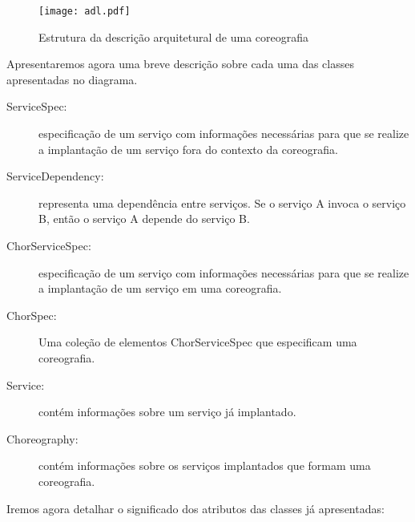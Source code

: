 \begin{figure}[!h]
  \centering
  \texttt{[image: adl.pdf]} 
  \caption{Estrutura da descrição arquitetural de uma coreografia}
  \label{fig:ee_adl} 
\end{figure}

Apresentaremos agora uma breve descrição sobre cada uma das classes apresentadas no diagrama.

\begin{description}

\item [ServiceSpec:] especificação de um serviço com informações necessárias para que se realize a implantação de um serviço fora do contexto da coreografia.

\item [ServiceDependency:] representa uma dependência entre serviços. Se o serviço A invoca o serviço B, então o serviço A depende do serviço B.

\item [ChorServiceSpec:] especificação de um serviço com informações necessárias para que se realize a implantação de um serviço em uma coreografia.

\item [ChorSpec:] Uma coleção de elementos ChorServiceSpec que especificam uma coreografia.

\item [Service:] contém informações sobre um serviço já implantado.

\item [Choreography:] contém informações sobre os serviços implantados que formam uma coreografia.

\end{description}

Iremos agora detalhar o significado dos atributos das classes já apresentadas:

